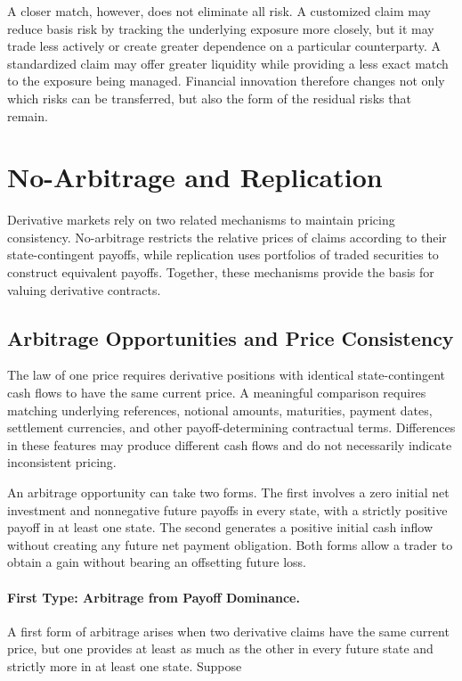 A closer match, however, does not eliminate all risk. A customized claim may reduce basis risk by tracking the underlying exposure more closely, but it may trade less actively or create greater dependence on a particular counterparty. A standardized claim may offer greater liquidity while providing a less exact match to the exposure being managed. Financial innovation therefore changes not only which risks can be transferred, but also the form of the residual risks that remain.

\section{No-Arbitrage and Replication}

Derivative markets rely on two related mechanisms
to maintain pricing consistency. No-arbitrage
restricts the relative prices of claims according
to their state-contingent payoffs, while replication
uses portfolios of traded securities to construct
equivalent payoffs. Together, these mechanisms
provide the basis for valuing derivative contracts.

\subsection{Arbitrage Opportunities and Price Consistency}

The law of one price requires derivative positions
with identical state-contingent cash flows to have
the same current price. A meaningful comparison
requires matching underlying references, notional
amounts, maturities, payment dates, settlement
currencies, and other payoff-determining contractual
terms. Differences in these features may produce
different cash flows and do not necessarily indicate
inconsistent pricing.

An arbitrage opportunity can take two forms.
The first involves a zero initial net investment
and nonnegative future payoffs in every state,
with a strictly positive payoff in at least one
state. The second generates a positive initial
cash inflow without creating any future net payment
obligation. Both forms allow a trader to obtain
a gain without bearing an offsetting future loss.

\paragraph{First Type: Arbitrage from Payoff Dominance.}

A first form of arbitrage arises when two
derivative claims have the same current price,
but one provides at least as much as the other
in every future state and strictly more in at
least one state. Suppose

